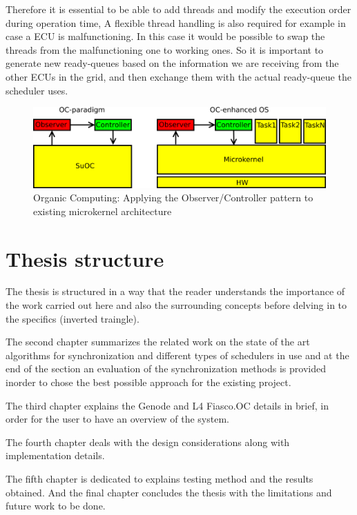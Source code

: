 Therefore it is essential to be able to add threads and modify the execution order 
during operation time, A flexible thread handling is also required for example in case 
a ECU is malfunctioning. In this case it would be possible to swap the threads from the 
malfunctioning one to working ones. So it is important to generate new ready-queues 
based on the information we are receiving from the other ECUs in the grid, and then 
exchange them with the actual ready-queue the scheduler uses.


\begin{figure}[architecture]
  \centering
  \includegraphics[scale = 0.5]{figures/microkernel_architecture.png}
  \caption{Organic Computing: Applying the Observer/Controller pattern to existing microkernel architecture}\label{architeture}
\end{figure}

\section{Thesis structure}
The thesis is structured in a way that the reader understands the importance of the work carried out here and also the surrounding concepts before delving in to the specifics (inverted traingle). 

The second chapter summarizes the related work on the state of the art algorithms for synchronization and different types of schedulers in use and at the end of the section an evaluation of the synchronization methods is provided inorder to chose the best possible approach for the existing project.

The third chapter explains the Genode and L4 Fiasco.OC details in brief, in order for the user to have an overview of the system. 

The fourth chapter deals with the design considerations along with implementation details.

The fifth chapter is dedicated to explains testing method and the results obtained.
And the final chapter concludes the thesis with the limitations and future work to be done. 
